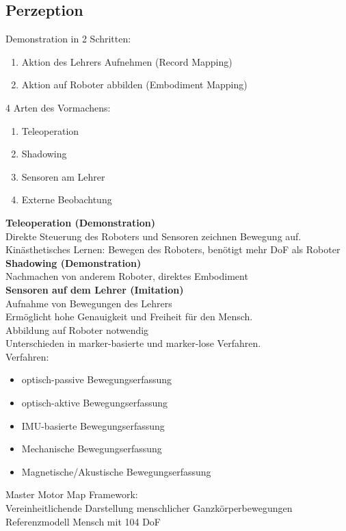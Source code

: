 \subsection{Perzeption}%
\label{pdv:sub:perzeption}
Demonstration in 2 Schritten:
\begin{enumerate}
\item Aktion des Lehrers Aufnehmen (Record Mapping)
\item Aktion auf Roboter abbilden (Embodiment Mapping)
\end{enumerate}

4 Arten des Vormachens:
\begin{enumerate}
\item Teleoperation
\item Shadowing
\item Sensoren am Lehrer
\item Externe Beobachtung
\end{enumerate}

\textbf{Teleoperation (Demonstration)}\\
Direkte Steuerung des Roboters und Sensoren zeichnen Bewegung auf.\\
Kinästhetisches Lernen: Bewegen des Roboters, benötigt mehr DoF als Roboter\\

\textbf{Shadowing (Demonstration)}\\
Nachmachen von anderem Roboter, direktes Embodiment\\

\textbf{Sensoren auf dem Lehrer (Imitation)}\\
Aufnahme von Bewegungen des Lehrers\\
Ermöglicht hohe Genauigkeit und Freiheit für den Mensch.\\
Abbildung auf Roboter notwendig\\
Unterschieden in marker-basierte und marker-lose Verfahren.\\
Verfahren:
\begin{itemize}
\item optisch-passive Bewegungserfassung
\item optisch-aktive Bewegungserfassung
\item IMU-basierte Bewegungserfassung
\item Mechanische Bewegungserfassung
\item Magnetische/Akustische Bewegungserfassung
\end{itemize}

Master Motor Map Framework:\\
Vereinheitlichende Darstellung menschlicher Ganzkörperbewegungen\\
Referenzmodell Mensch mit 104 DoF\\

